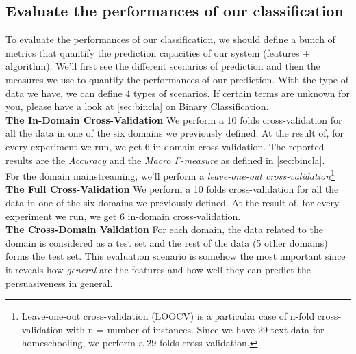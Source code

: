 \subsection{Evaluate the performances of our classification}
To evaluate the performances of our classification, we should define a bunch of metrics that quantify the prediction capacities of our system (features + algorithm). We'll first see the different scenarios of prediction and then the measures we use to quantify the performances of our prediction. With the type of data we have, we can define 4 types of scenarios. If certain terms are unknown for you, please have a look at \cref{sec:bincla} on Binary Classification.
\\

\textbf{The In-Domain Cross-Validation}
We perform a 10 folds cross-validation for all the data in one of the six domains we previously defined. At the result of, for every experiment we run, we get 6 in-domain cross-validation. The reported results are the \emph{Accuracy} and the \emph{Macro F-measure} as defined in \cref{sec:bincla}.
\\
For the domain mainstreaming, we'll perform a \emph{leave-one-out cross-validation}\footnote{Leave-one-out cross-validation (LOOCV) is a particular case of n-fold cross-validation with n = number of instances. Since we have 29 text data for homeschooling, we perform a 29 folds cross-validation.}
\\

\textbf{The Full Cross-Validation}
We perform a 10 folds cross-validation for all the data in one of the six domains we previously defined. At the result of, for every experiment we run, we get 6 in-domain cross-validation.
\\

\textbf{The Cross-Domain Validation}
For each domain, the data related to the domain is considered as a test set and the rest of the data (5 other domains) forms the test set. This evaluation scenario is somehow the most important since it reveals how \emph{general} are the features and how well they can predict the persuasiveness in general.
\\

